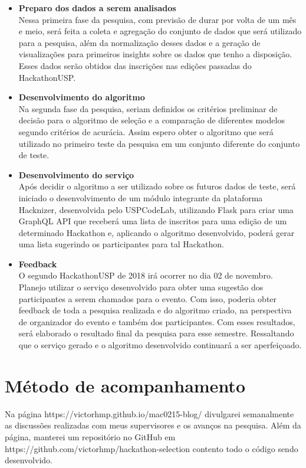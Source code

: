 \documentclass[10pt,twoside,a4paper]{article}
\begin{document}
  \begin{itemize}
    \item \textbf{Preparo dos dados a serem analisados} \\
        Nessa primeira fase da pesquisa, com previsão de durar por volta de um mês e meio, será feita a coleta e agregação do conjunto de dados que será utilizado para a pesquisa, além da normalização desses dados e a geração de visualizações para primeiros insights sobre os dados que tenho a disposição. Esses dados serão obtidos das inscrições nas edições passadas do HackathonUSP.
    
    \item \textbf{Desenvolvimento do algoritmo} \\
        Na segunda fase da pesquisa, seriam definidos os critérios preliminar de decisão para o algoritmo de seleção e a comparação de diferentes modelos segundo critérios de acurácia. Assim espero obter o algoritmo que será utilizado no primeiro teste da pesquisa em um conjunto diferente do conjunto de teste.
          
    \item \textbf{Desenvolvimento do serviço} \\
        Após decidir o algoritmo a ser utilizado sobre os futuros dados de teste, será iniciado o desenvolvimento de um módulo integrante da plataforma Hacknizer, desenvolvida pelo USPCodeLab, utilizando Flask para criar uma GraphQL API que receberá uma lista de inscritos para uma edição de um determinado Hackathon e, aplicando o algoritmo desenvolvido, poderá gerar uma lista sugerindo os participantes para tal Hackathon. 
    
    \item \textbf{Feedback} \\
        O segundo HackathonUSP de 2018 irá ocorrer no dia 02 de novembro. Planejo utilizar o serviço desenvolvido para obter uma sugestão dos participantes a serem chamados para o evento. Com isso, poderia obter feedback de toda a pesquisa realizada e do algoritmo criado, na perspectiva de organizador do evento e também dos participantes. Com esses resultados, será elaborado o resultado final da pesquisa para esse semestre. Ressaltando que o serviço gerado e o algoritmo desenvolvido continuará a ser aperfeiçoado.

  \end{itemize}

\section{Método de acompanhamento}

    Na página https://victorhmp.github.io/mac0215-blog/ divulgarei semanalmente as discussões realizadas com meus supervisores e os avanços na pesquisa. Além da página, manterei um repositório no GitHub em \\
https://github.com/victorhmp/hackathon-selection contento todo o código sendo desenvolvido.
\end{document}
